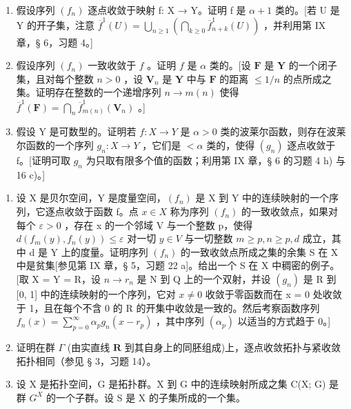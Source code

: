 \begin{enumerate}
\def\labelenumi{\alph{enumi})}
\item
  假设序列 \((f_{n})\) 逐点收敛于映射 f: X → Y。证明 f 是 \(\alpha + 1\) 类的。{[}若 U 是 Y 的开子集，注意 \(\overline{f}^{1}(U) = \bigcup_{n \geqslant 1} \left( \bigcap_{k \geqslant 0} \overline{f}_{n+k}^{1}(U) \right)\) ，并利用第 IX 章，§ 6，习题 4。{]}
\item
  假设序列 \((f_n)\) 一致收敛于 \(f\) 。证明 \(f\) 是 \(\alpha\) 类的。{[}设 \(\mathbf{F}\) 是 \(\mathbf{Y}\) 的一个闭子集，且对每个整数 \(n > 0\) ，设 \(\mathbf{V}_n\) 是 \(\mathbf{Y}\) 中与 \(\mathbf{F}\) 的距离 \(\leqslant 1/n\) 的点所成之集。证明存在整数的一个递增序列 \(n \to m(n)\) 使得 \(\overline{f}^1(\mathbf{F}) = \bigcap_{n} \overline{f}_{m(n)}^1(\mathbf{V}_n)\) 。{]}
\item
  假设 Y 是可数型的。证明若 \(f: X \to Y\) 是 \(\alpha > 0\) 类的波莱尔函数，则存在波莱尔函数的一个序列 \(g_{n}: X \to Y\) ，它们是 \(<\alpha\) 类的，使得 \((g_{n})\) 逐点收敛于 f。{[}证明可取 \(g_{n}\) 为只取有限多个值的函数；利用第 IX 章，§ 6 的习题 4 h) 与 16 c)。{]}
\end{enumerate}

\begin{enumerate}
\def\labelenumi{\arabic{enumi})}
\setcounter{enumi}{8}
\item
  设 X 是贝尔空间，Y 是度量空间，\((f_{n})\) 是 X 到 Y 中的连续映射的一个序列，它逐点收敛于函数 f。点 \(x \in X\) 称为序列 \((f_{n})\) 的一致收敛点，如果对每个 \(\varepsilon > 0\) ，存在 x 的一个邻域 V 与一个整数 p，使得 \(d(f_{m}(y), f_{n}(y)) \leqslant \varepsilon\) 对一切 \(y \in V\) 与一切整数 \(m \geqslant p, n \geqslant p, d\) 成立，其中 d 是 Y 上的度量。证明序列 \((f_{n})\) 的一致收敛点所成之集的余集 S 在 X 中是贫集{[}参见第 IX 章，§ 5，习题 22 a{]}。给出一个 S 在 X 中稠密的例子。{[}取 X = Y = R，设 \(n \to r_{n}\) 是 N 到 Q 上的一个双射，并设 \((g_{n})\) 是 R 到 {[}0, 1{]} 中的连续映射的一个序列，它对 \(x \neq 0\) 收敛于零函数而在 x = 0 处收敛于 1，且在每个不含 0 的 R 的开集中收敛是一致的。然后考察函数序列 \(f_{n}(x) = \sum_{p=0}^{\infty} \alpha_{p} g_{n}(x - r_{p})\) ，其中序列 \((\alpha_{p})\) 以适当的方式趋于 0。{]}
\item
  证明在群 \(\Gamma\) (由实直线 \(\mathbf{R}\) 到其自身上的同胚组成)上，逐点收敛拓扑与紧收敛拓扑相同（参见 § 3，习题 14）。
\item
  设 X 是拓扑空间，G 是拓扑群。X 到 G 中的连续映射所成之集 C(X; G) 是群 \(G^{X}\) 的一个子群。设 S 是 X 的子集所成的一个集。
\end{enumerate}

